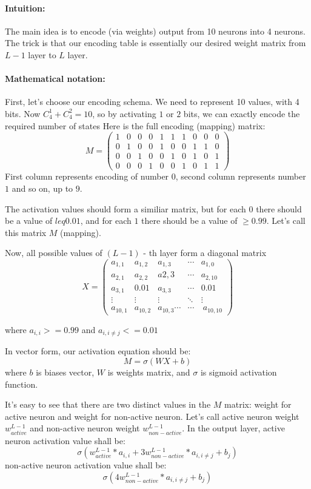\documentclass{article}
\begin{document}
\paragraph{Intuition:}
The main idea is to encode (via weights) output from 10 neurons into 4 neurons. 
The trick is that our encoding table is essentially our desired weight matrix from $L-1$ layer to $L$ layer.

\paragraph{Mathematical notation:}
First, let's choose our encoding schema. 
We need to represent 10 values, with 4 bits.
Now $C^1_4 + C^2_4 = 10$, so by activating $1$ or $2$ bits, we can exactly encode the required number of states
Here is the full encoding (mapping) matrix:
$$M = 
\begin{pmatrix}
1 & 0 & 0 & 0 & 1 & 1 & 1 & 0 & 0 & 0\\
0 & 1 & 0 & 0 & 1 & 0 & 0 & 1 & 1 & 0\\
0 & 0 & 1 & 0 & 0 & 1 & 0 & 1 & 0 & 1\\
0 & 0 & 0 & 1 & 0 & 0 & 1 & 0 & 1 & 1
\end{pmatrix}$$
First column represents encoding of number $0$, second column represents number $1$ and so on, up to $9$.

The activation values should form a similiar matrix, but for each $0$ there should be a value of $leq 0.01$, and for each $1$ there should be a value of $\geq 0.99$. Let's call this matrix $M$ (mapping).

Now, all possible values of $(L-1)$ - th layer form a diagonal matrix
$$X = 
\begin{pmatrix}
a_{1,1} & a_{1,2} & a_{1,3} & \cdots & a_{1,0}\\
a_{2,1} & a_{2,2} & a{2,3} & \cdots & a_{2,10}\\
a_{3,1} & 0.01 & a_{3,3} &\cdots & 0.01\\
\vdots & \vdots & \vdots & \ddots & \vdots\\
a_{10,1} & a_{10,2} & a_{10,3} \cdots & \cdots & \ a_{10,10}
\end{pmatrix}$$

where $a_{i,i} >= 0.99$ and $a_{i,i \neq j} <= 0.01$

In vector form, our activation equation should be:
$$M = \sigma(WX + b)$$
where $b$ is biases vector, $W$ is weights matrix, and $\sigma$ is sigmoid activation function.

It's easy to see that there are two distinct values in the $M$ matrix: weight for active neuron and weight for non-active neuron.
Let's call active neuron weight $w_{active}^{L-1}$ and non-active neuron weight $w_{non-active}^{L-1}$.
In the output layer, active neuron activation value shall be:
$$\sigma(w_{active}^{L-1} * a_{i,i} + 3w_{non-active}^{L-1} * a_{i,i \neq j} + b_j)$$
non-active neuron activation value shall be:
$$\sigma(4w_{non-active}^{L-1} * a_{i,i \neq j} + b_j)$$
\end{document}
